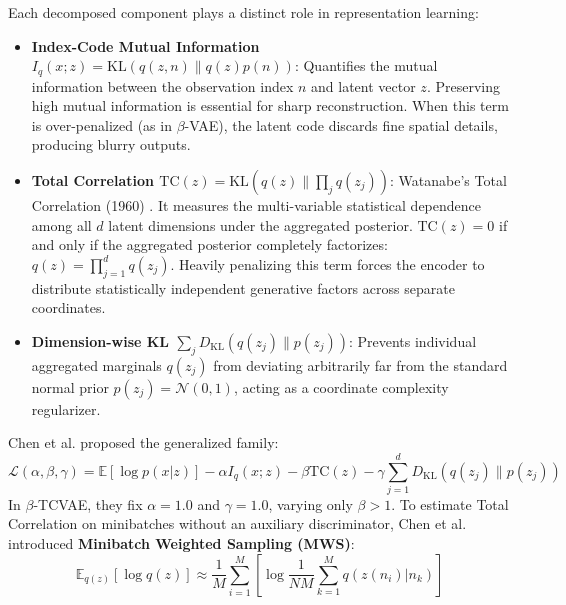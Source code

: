 \documentclass[11pt,a4paper]{article}
\begin{document}
Each decomposed component plays a distinct role in representation learning:
\begin{itemize}
    \item \textbf{Index-Code Mutual Information $I_q(x; z) = \text{KL}(q(z, n) \parallel q(z)p(n))$}: Quantifies the mutual information between the observation index $n$ and latent vector $z$. Preserving high mutual information is essential for sharp reconstruction. When this term is over-penalized (as in $\beta$-VAE), the latent code discards fine spatial details, producing blurry outputs.
    \item \textbf{Total Correlation $\text{TC}(z) = \text{KL}(q(z) \parallel \prod_j q(z_j))$}: Watanabe's Total Correlation (1960) \cite{watanabe1960information}. It measures the multi-variable statistical dependence among all $d$ latent dimensions under the aggregated posterior. $\text{TC}(z) = 0$ if and only if the aggregated posterior completely factorizes: $q(z) = \prod_{j=1}^d q(z_j)$. Heavily penalizing this term forces the encoder to distribute statistically independent generative factors across separate coordinates.
    \item \textbf{Dimension-wise KL $\sum_j D_{\text{KL}}(q(z_j) \parallel p(z_j))$}: Prevents individual aggregated marginals $q(z_j)$ from deviating arbitrarily far from the standard normal prior $p(z_j) = \mathcal{N}(0, 1)$, acting as a coordinate complexity regularizer.
\end{itemize}

Chen et al. \cite{chen2018isolating} proposed the generalized family:
\begin{equation}
\mathcal{L}(\alpha, \beta, \gamma) = \mathbb{E}[\log p(x|z)] - \alpha I_q(x; z) - \beta \text{TC}(z) - \gamma \sum_{j=1}^d D_{\text{KL}}(q(z_j) \parallel p(z_j))
\label{eq:beta_tcvae_family}
\end{equation}
In $\beta$-TCVAE, they fix $\alpha = 1.0$ and $\gamma = 1.0$, varying only $\beta > 1$. To estimate Total Correlation on minibatches without an auxiliary discriminator, Chen et al. introduced \textbf{Minibatch Weighted Sampling (MWS)}:
\begin{equation}
\mathbb{E}_{q(z)}[\log q(z)] \approx \frac{1}{M}\sum_{i=1}^M \left[ \log \frac{1}{NM} \sum_{k=1}^M q(z(n_i)|n_k) \right]
\label{eq:mws}
\end{equation}
\end{document}
